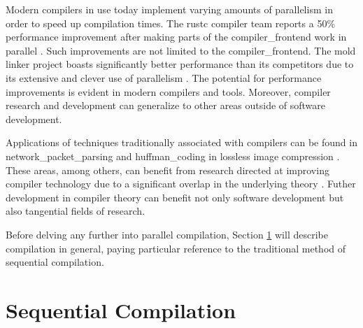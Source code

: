 Modern compilers in use today implement varying amounts of parallelism in order
to speed up compilation times. The \gls{rustc} compiler team reports a 50\%
performance improvement after making parts of the \gls{compiler_frontend} work
in parallel \citep{nicholas_nethercote_faster_2023}. Such improvements are not
limited to the \gls{compiler_frontend}. The mold \gls{linker} project boasts
significantly better performance than its competitors due to its extensive and
clever use of parallelism \citep{rui_ueyama_design_nodate}. The potential for
performance improvements is evident in modern compilers and tools. Moreover,
compiler research and development can generalize to other areas outside of
software development.

Applications of techniques traditionally associated with compilers can
be found in \gls{network_packet_parsing} \citep{wang_hyperscan_2019,
roesch_snort_1999} and \Gls{huffman_coding} in lossless image compression
\citep{howard_parallel_1996}. These areas, among others, can benefit from
research directed at improving compiler technology due to a significant
overlap in the underlying theory \citep{mytkowicz_data-parallel_2014}. Futher
development in compiler theory can benefit not only software development but
also tangential fields of research.

Before delving any further into parallel compilation, Section \ref{seq_comp}
will describe compilation in general, paying particular reference to the
traditional method of sequential compilation.

\section{Sequential Compilation} \label{seq_comp}

